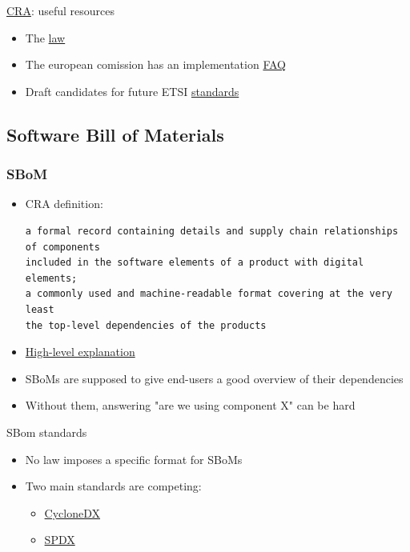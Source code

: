 \begin{frame}{\href{https://eur-lex.europa.eu/legal-content/EN/TXT/?uri=CELEX\%3A02024R2847-20241120}{CRA}: useful resources}
  \begin{itemize}
    \item The \href{https://eur-lex.europa.eu/legal-content/EN/TXT/?uri=CELEX\%3A02024R2847-20241120}{law}
    \item The european comission has an implementation
          \href{https://digital-strategy.ec.europa.eu/en/library/cyber-resilience-act-implementation-frequently-asked-questions}{FAQ}
    \item Draft candidates for future ETSI \href{https://docbox.etsi.org/CYBER/EUSR/Open}{standards}
  \end{itemize}
\end{frame}

\subsection{Software Bill of Materials}

\begin{frame}[fragile]
  \frametitle{SBoM}
  \begin{itemize}
    \item CRA definition:
    \begin{verbatim}
a formal record containing details and supply chain relationships of components
included in the software elements of a product with digital elements;
a commonly used and machine-readable format covering at the very least
the top-level dependencies of the products
    \end{verbatim}
    \item \href{https://www.cisa.gov/resources-tools/resources/shared-vision-software-bill-materials-sbom-cybersecurity}{High-level explanation}
    \item SBoMs are supposed to give end-users a good overview of their dependencies
    \item Without them, answering "are we using component X" can be hard
  \end{itemize}
\end{frame}

\begin{frame}{SBom standards}
  \begin{itemize}
    \item No law imposes a specific format for SBoMs
    \item Two main standards are competing:
    \begin{itemize}
      \item \href{https://cyclonedx.org/}{CycloneDX}
      \item \href{https://spdx.dev/}{SPDX}
    \end{itemize}
  \end{itemize}
\end{frame}

